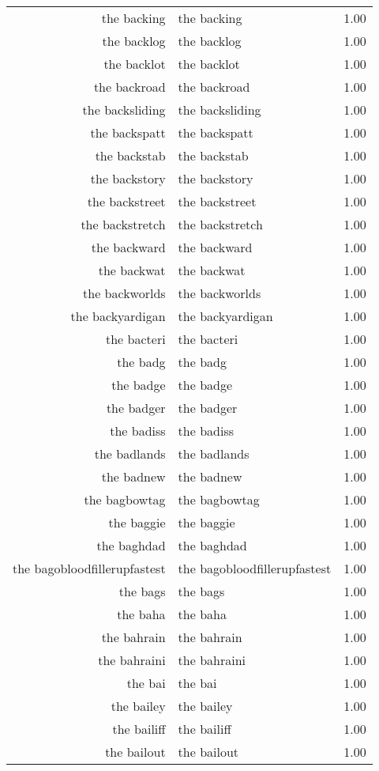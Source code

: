 \begin{table}[ht]
\begin{tabular}{rlr}
  the backing & the backing & 1.00 \\ 
  the backlog & the backlog & 1.00 \\ 
  the backlot & the backlot & 1.00 \\ 
  the backroad & the backroad & 1.00 \\ 
  the backsliding & the backsliding & 1.00 \\ 
  the backspatt & the backspatt & 1.00 \\ 
  the backstab & the backstab & 1.00 \\ 
  the backstory & the backstory & 1.00 \\ 
  the backstreet & the backstreet & 1.00 \\ 
  the backstretch & the backstretch & 1.00 \\ 
  the backward & the backward & 1.00 \\ 
  the backwat & the backwat & 1.00 \\ 
  the backworlds & the backworlds & 1.00 \\ 
  the backyardigan & the backyardigan & 1.00 \\ 
  the bacteri & the bacteri & 1.00 \\ 
  the badg & the badg & 1.00 \\ 
  the badge & the badge & 1.00 \\ 
  the badger & the badger & 1.00 \\ 
  the badiss & the badiss & 1.00 \\ 
  the badlands & the badlands & 1.00 \\ 
  the badnew & the badnew & 1.00 \\ 
  the bagbowtag & the bagbowtag & 1.00 \\ 
  the baggie & the baggie & 1.00 \\ 
  the baghdad & the baghdad & 1.00 \\ 
  the bagobloodfillerupfastest & the bagobloodfillerupfastest & 1.00 \\ 
  the bags & the bags & 1.00 \\ 
  the baha & the baha & 1.00 \\ 
  the bahrain & the bahrain & 1.00 \\ 
  the bahraini & the bahraini & 1.00 \\ 
  the bai & the bai & 1.00 \\ 
  the bailey & the bailey & 1.00 \\ 
  the bailiff & the bailiff & 1.00 \\ 
  the bailout & the bailout & 1.00 \\ 

\end{tabular}
\end{table}
